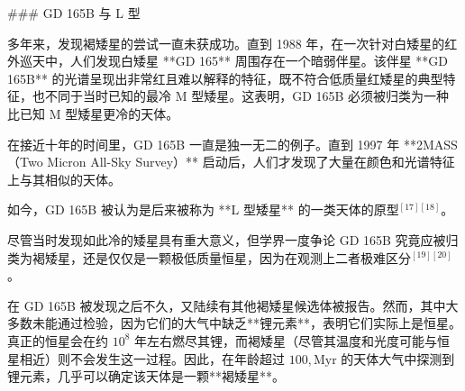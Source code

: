 ### GD 165B 与 L 型

多年来，发现褐矮星的尝试一直未获成功。直到 1988 年，在一次针对白矮星的红外巡天中，人们发现白矮星 **GD 165** 周围存在一个暗弱伴星。该伴星 **GD 165B** 的光谱呈现出非常红且难以解释的特征，既不符合低质量红矮星的典型特征，也不同于当时已知的最冷 M 型矮星。这表明，GD 165B 必须被归类为一种比已知 M 型矮星更冷的天体。

在接近十年的时间里，GD 165B 一直是独一无二的例子。直到 1997 年 **2MASS（Two Micron All-Sky Survey）** 启动后，人们才发现了大量在颜色和光谱特征上与其相似的天体。

如今，GD 165B 被认为是后来被称为 **L 型矮星** 的一类天体的原型$^{[17][18]}$。

尽管当时发现如此冷的矮星具有重大意义，但学界一度争论 GD 165B 究竟应被归类为褐矮星，还是仅仅是一颗极低质量恒星，因为在观测上二者极难区分$^{[19][20]}$。

在 GD 165B 被发现之后不久，又陆续有其他褐矮星候选体被报告。然而，其中大多数未能通过检验，因为它们的大气中缺乏**锂元素**，表明它们实际上是恒星。真正的恒星会在约 $10^8$ 年左右燃尽其锂，而褐矮星（尽管其温度和光度可能与恒星相近）则不会发生这一过程。因此，在年龄超过 $100,\mathrm{Myr}$ 的天体大气中探测到锂元素，几乎可以确定该天体是一颗**褐矮星**。
